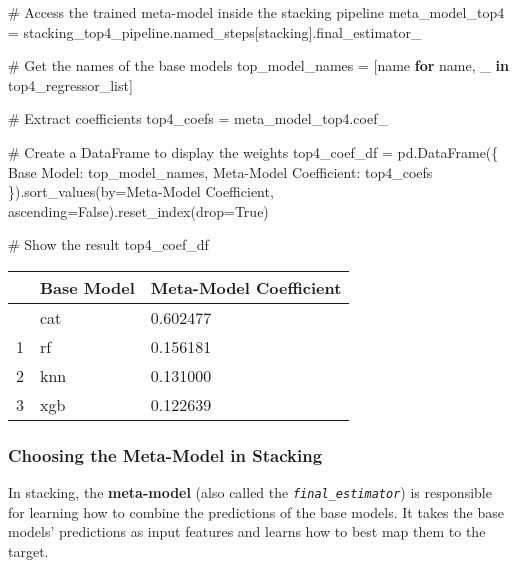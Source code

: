 \documentclass[
  letterpaper,
  DIV=11,
  numbers=noendperiod]{scrreprt}
\newenvironment{Shaded}{\begin{snugshade}}{\end{snugshade}}
\newcommand{\CommentTok}[1]{\textcolor[rgb]{0.37,0.37,0.37}{#1}}
\newcommand{\ControlFlowTok}[1]{\textcolor[rgb]{0.00,0.23,0.31}{\textbf{#1}}}
\newcommand{\KeywordTok}[1]{\textcolor[rgb]{0.00,0.23,0.31}{\textbf{#1}}}
\newcommand{\NormalTok}[1]{\textcolor[rgb]{0.00,0.23,0.31}{#1}}
\newcommand{\OperatorTok}[1]{\textcolor[rgb]{0.37,0.37,0.37}{#1}}
\newcommand{\StringTok}[1]{\textcolor[rgb]{0.13,0.47,0.30}{#1}}
\newcommand{\VariableTok}[1]{\textcolor[rgb]{0.07,0.07,0.07}{#1}}
\begin{document}
\begin{Shaded}
\begin{Highlighting}[]
\CommentTok{\# Access the trained meta{-}model inside the stacking pipeline}
\NormalTok{meta\_model\_top4 }\OperatorTok{=}\NormalTok{ stacking\_top4\_pipeline.named\_steps[}\StringTok{\textquotesingle{}stacking\textquotesingle{}}\NormalTok{].final\_estimator\_}

\CommentTok{\# Get the names of the base models}
\NormalTok{top\_model\_names }\OperatorTok{=}\NormalTok{ [name }\ControlFlowTok{for}\NormalTok{ name, \_ }\KeywordTok{in}\NormalTok{ top4\_regressor\_list]}

\CommentTok{\# Extract coefficients}
\NormalTok{top4\_coefs }\OperatorTok{=}\NormalTok{ meta\_model\_top4.coef\_}

\CommentTok{\# Create a DataFrame to display the weights}
\NormalTok{top4\_coef\_df }\OperatorTok{=}\NormalTok{ pd.DataFrame(\{}
    \StringTok{\textquotesingle{}Base Model\textquotesingle{}}\NormalTok{: top\_model\_names,}
    \StringTok{\textquotesingle{}Meta{-}Model Coefficient\textquotesingle{}}\NormalTok{: top4\_coefs}
\NormalTok{\}).sort\_values(by}\OperatorTok{=}\StringTok{\textquotesingle{}Meta{-}Model Coefficient\textquotesingle{}}\NormalTok{, ascending}\OperatorTok{=}\VariableTok{False}\NormalTok{).reset\_index(drop}\OperatorTok{=}\VariableTok{True}\NormalTok{)}

\CommentTok{\# Show the result}
\NormalTok{top4\_coef\_df}
\end{Highlighting}
\end{Shaded}

\begin{longtable}[]{@{}lll@{}}
\toprule\noalign{}
& Base Model & Meta-Model Coefficient \\
\midrule\noalign{}
\endhead
\bottomrule\noalign{}
\endlastfoot
0 & cat & 0.602477 \\
1 & rf & 0.156181 \\
2 & knn & 0.131000 \\
3 & xgb & 0.122639 \\
\end{longtable}

\subsubsection{Choosing the Meta-Model in
Stacking}\label{choosing-the-meta-model-in-stacking}

In stacking, the \textbf{meta-model} (also called the
\emph{\texttt{final\_estimator}}) is responsible for learning how to
combine the predictions of the base models. It takes the base models'
predictions as input features and learns how to best map them to the
target.
\end{document}
